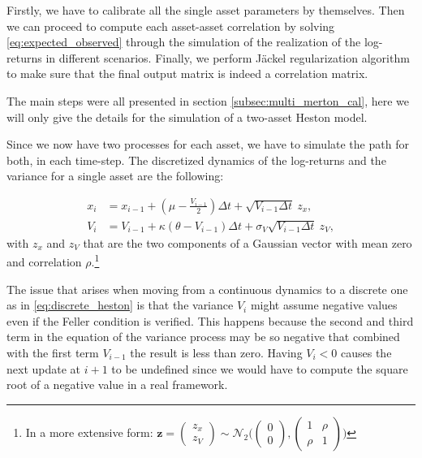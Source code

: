 Firstly, we have to calibrate all the single asset parameters by themselves. Then we can proceed to compute each asset-asset correlation by solving \eqref{eq:expected_observed} through the simulation of the realization of the log-returns in different scenarios.
Finally, we perform J\"ackel regularization algorithm to make sure that the final output matrix is indeed a correlation matrix.

The main steps were all presented in section \ref{subsec:multi_merton_cal}, here we will only give the details for the simulation of a two-asset Heston model.

Since we now have two processes for each asset, we have to simulate the path for both, in each time-step.
The discretized dynamics of the log-returns and the variance for a single asset are the following:

\begin{subequations}
	\label{eq:discrete_heston}
	\begin{align}
		x_i &= x_{i-1} + (\mu -  \frac{V_{i-1}}{2})\Delta t + \sqrt{V_{i-1} \Delta t} \:z_x, \\
		V_i &= V_{i-1} + \kappa(\theta - V_{i-1} )\Delta t + \sigma_V \sqrt{V_{i-1} \Delta t} \: z_V,
	\end{align}
\end{subequations}
with $z_x$ and $z_V$ that are the two components of a Gaussian vector with mean zero and correlation $\rho$.\footnote{In a more extensive form: $ \mathbf{z} = \begin{pmatrix}
	z_x\\ z_V
	\end{pmatrix} \sim \mathcal{N}_2 \Big(\begin{pmatrix}
	0\\ 0\end{pmatrix}, \begin{pmatrix}
	1& \rho\\ \rho&1
	\end{pmatrix} \Big)$}

The issue that arises when moving from a continuous dynamics to a discrete one as in \eqref{eq:discrete_heston} is that the variance $V_i$ might assume negative values even if the Feller condition is verified. This happens because the second and third term in the equation of the variance process may be so negative that combined with the first term $V_{i-1}$ the result is less than zero.
Having $V_i < 0$ causes the next update at $i+1$ to be undefined since we would have to compute the square root of a negative value in a real framework.

